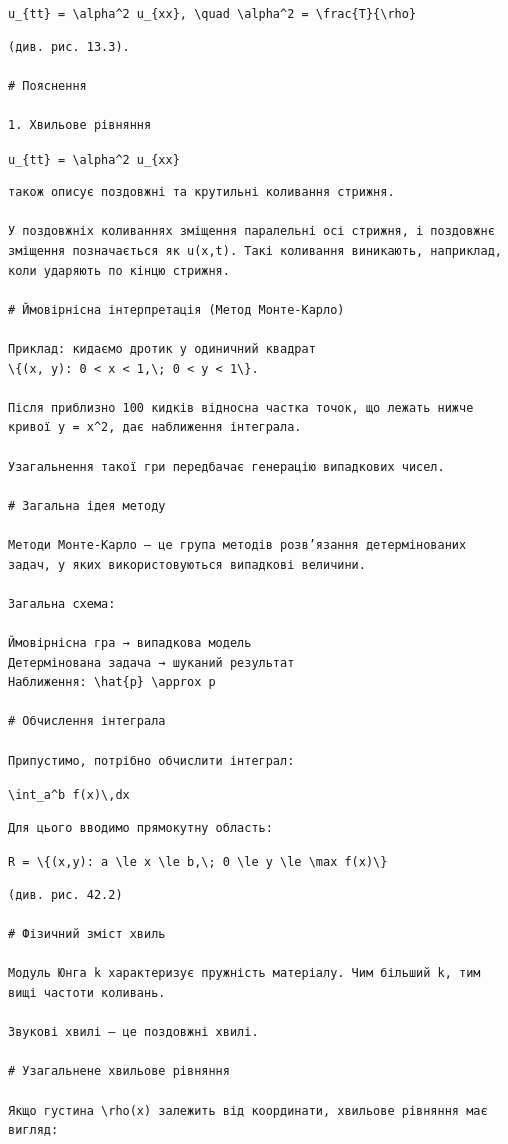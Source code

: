 \documentclass[
  ukrainian,
]{article}
\begin{document}
\texttt{u\_\{tt\}\ =\ \textbackslash{}alpha\^{}2\ u\_\{xx\},\ \textbackslash{}quad\ \textbackslash{}alpha\^{}2\ =\ \textbackslash{}frac\{T\}\{\textbackslash{}rho\}}

\begin{verbatim}
(див. рис. 13.3).

# Пояснення

1. Хвильове рівняння
\end{verbatim}

\texttt{u\_\{tt\}\ =\ \textbackslash{}alpha\^{}2\ u\_\{xx\}}

\begin{verbatim}
також описує поздовжні та крутильні коливання стрижня.

У поздовжніх коливаннях зміщення паралельні осі стрижня, і поздовжнє зміщення позначається як u(x,t). Такі коливання виникають, наприклад, коли ударяють по кінцю стрижня.

# Ймовірнісна інтерпретація (Метод Монте-Карло)

Приклад: кидаємо дротик у одиничний квадрат  
\{(x, y): 0 < x < 1,\; 0 < y < 1\}.

Після приблизно 100 кидків відносна частка точок, що лежать нижче кривої y = x^2, дає наближення інтеграла.

Узагальнення такої гри передбачає генерацію випадкових чисел.

# Загальна ідея методу

Методи Монте-Карло — це група методів розв’язання детермінованих задач, у яких використовуються випадкові величини.

Загальна схема:

Ймовірнісна гра → випадкова модель  
Детермінована задача → шуканий результат  
Наближення: \hat{p} \approx p

# Обчислення інтеграла

Припустимо, потрібно обчислити інтеграл:
\end{verbatim}

\texttt{\textbackslash{}int\_a\^{}b\ f(x)\textbackslash{},dx}

\begin{verbatim}
Для цього вводимо прямокутну область:
\end{verbatim}

\texttt{R\ =\ \textbackslash{}\{(x,y):\ a\ \textbackslash{}le\ x\ \textbackslash{}le\ b,\textbackslash{};\ 0\ \textbackslash{}le\ y\ \textbackslash{}le\ \textbackslash{}max\ f(x)\textbackslash{}\}}

\begin{verbatim}
(див. рис. 42.2)

# Фізичний зміст хвиль

Модуль Юнга k характеризує пружність матеріалу. Чим більший k, тим вищі частоти коливань.

Звукові хвилі — це поздовжні хвилі.

# Узагальнене хвильове рівняння

Якщо густина \rho(x) залежить від координати, хвильове рівняння має вигляд:
\end{verbatim}
\end{document}
